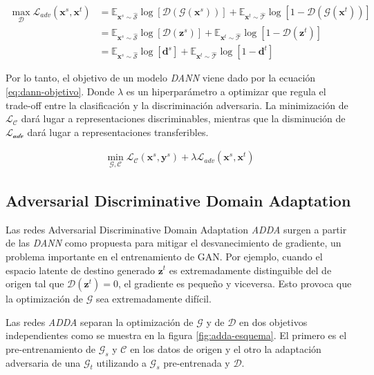 \begin{align}
  \max_{\mathcal{D}} \mathcal{L}_{adv}(\mathbf{x}^s, \mathbf{x}^t) & = \mathbb{E}_{\mathbf{x}^s \sim \mathcal{\hat{S}}}\log[\mathcal{D}(\mathcal{G}(\mathbf{x}^s))] + \mathbb{E}_{\mathbf{x}^t \sim \mathcal{\hat{T}}}\log[1-\mathcal{D}(\mathcal{G}(\mathbf{x}^t))] \nonumber \\
                                                                   & = \mathbb{E}_{\mathbf{x}^s \sim \mathcal{\hat{S}}}\log[\mathcal{D}(\mathbf{z}^s)] + \mathbb{E}_{\mathbf{x}^t \sim \mathcal{\hat{T}}}\log[1-\mathcal{D}(\mathbf{z}^t)] \nonumber                           \\
                                                                   & = \mathbb{E}_{\mathbf{x}^s \sim \mathcal{\hat{S}}}\log[\mathbf{d}^s] + \mathbb{E}_{\mathbf{x}^t \sim \mathcal{\hat{T}}}\log[1-\mathbf{d}^t]
  \label{eq:dann-loss-discriminadora}
\end{align}

Por lo tanto, el objetivo de un modelo {\it DANN} viene dado por la ecuación \ref{eq:dann-objetivo}. Donde $\lambda$ es
un hiperparámetro a optimizar que regula el trade-off entre la clasificación y la discriminación adversaria. La
minimización de $\mathcal{L}_\mathcal{C}$ dará lugar a representaciones discriminables, mientras que la disminución de
$\mathcal{L}_\mathcal{adv}$ dará lugar a representaciones transferibles.

\begin{align}
  \min_{\mathcal{G},\mathcal{C}} \mathcal{L}_\mathcal{C}(\mathbf{x}^s, \mathbf{y}^s) + \lambda \mathcal{L}_{adv}(\mathbf{x}^s, \mathbf{x}^t)
  \label{eq:dann-objetivo}
\end{align}

\subsection{Adversarial Discriminative Domain Adaptation}
Las redes Adversarial Discriminative Domain Adaptation {\it ADDA} \parencite{tzeng2017adversarial} surgen a partir de las {\it DANN} como propuesta para mitigar el desvanecimiento de
gradiente, un problema importante en el entrenamiento de GAN. Por ejemplo, cuando el espacio latente de destino
generado $\mathbf{z}^t$ es extremadamente distinguible del de origen tal que $\mathcal{D}(\mathbf{z}^t)=0$, el
gradiente es pequeño y viceversa. Esto provoca que la optimización de $\mathcal{G}$ sea extremadamente difícil.

Las redes {\it ADDA} separan la optimización de $\mathcal{G}$ y de $\mathcal{D}$ en dos objetivos independientes como
se muestra en la figura \ref{fig:adda-esquema}. El primero es el pre-entrenamiento de $\mathcal{G}_s$ y $\mathcal{C}$
en los datos de origen y el otro la adaptación adversaria de una $\mathcal{G}_t$ utilizando a $\mathcal{G}_s$
pre-entrenada y $\mathcal{D}$.

